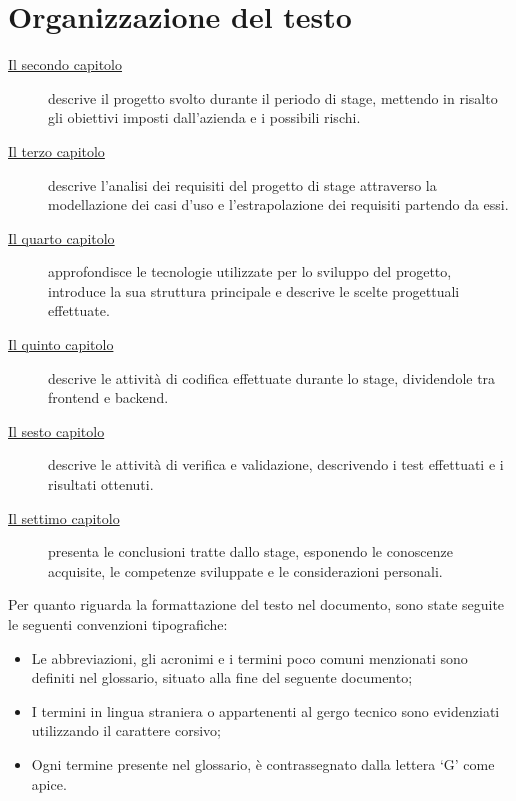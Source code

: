 \section{Organizzazione del testo}\label{sec:organizzazione-testo}
\begin{description}
    \item[{\hyperref[cap:descrizione-stage]{Il secondo capitolo}}] descrive il progetto svolto durante il periodo di stage, mettendo in risalto gli obiettivi imposti dall'azienda e i possibili rischi.
    \item[{\hyperref[cap:analisi-requisiti]{Il terzo capitolo}}] descrive l'analisi dei requisiti del progetto di stage attraverso la modellazione dei casi d'uso e l'estrapolazione dei requisiti partendo da essi.
    \item[{\hyperref[cap:struttura-progettazione]{Il quarto capitolo}}] approfondisce le tecnologie utilizzate per lo sviluppo del progetto, introduce la sua struttura principale e descrive le scelte progettuali effettuate.
    \item[{\hyperref[cap:codifica]{Il quinto capitolo}}] descrive le attività di codifica effettuate durante lo stage, dividendole tra frontend e backend.
    \item[{\hyperref[cap:verifica-validazione]{Il sesto capitolo}}] descrive le attività di verifica e validazione, descrivendo i test effettuati e i risultati ottenuti.
    \item[{\hyperref[cap:conclusioni]{Il settimo capitolo}}] presenta le conclusioni tratte dallo stage, esponendo le conoscenze acquisite, le competenze sviluppate e le considerazioni personali. 
\end{description}

\clearpage

Per quanto riguarda la formattazione del testo nel documento, sono state seguite le seguenti convenzioni tipografiche:
\begin{itemize}
  \item Le abbreviazioni, gli acronimi e i termini poco comuni menzionati sono definiti nel glossario, situato alla fine del seguente documento;
  \item I termini in lingua straniera o appartenenti al gergo tecnico sono evidenziati utilizzando il carattere corsivo;
  \item Ogni termine presente nel glossario, è contrassegnato dalla lettera `G' come apice.
\end{itemize}
